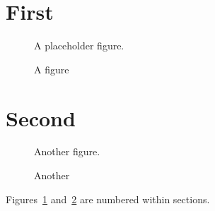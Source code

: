 \documentclass{article}
\begin{document}
\section{First}
\begin{figure}\centering A placeholder figure.\caption{A figure}\label{fig:a}\end{figure}
\section{Second}
\begin{figure}\centering Another figure.\caption{Another}\label{fig:b}\end{figure}
Figures~\ref{fig:a} and~\ref{fig:b} are numbered within sections.
\end{document}
